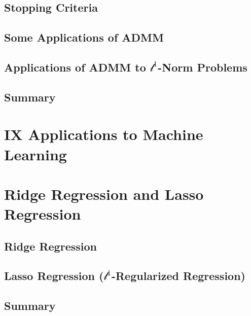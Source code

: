 \documentclass[a4paper]{article}
\begin{document}
\subsection{ Stopping Criteria} %

\subsection{ Some Applications of ADMM} %

\subsection{ Applications of ADMM to $\mathcal{l}^1$-Norm Problems} %

\subsection{ Summary} %


\newpage
\section*{IX Applications to Machine Learning}
\section{Ridge Regression and Lasso Regression}
\subsection{ Ridge Regression} %

\subsection{ Lasso Regression ($\mathcal{l}^1$-Regularized Regression)} %

\subsection{ Summary} %
\end{document}
